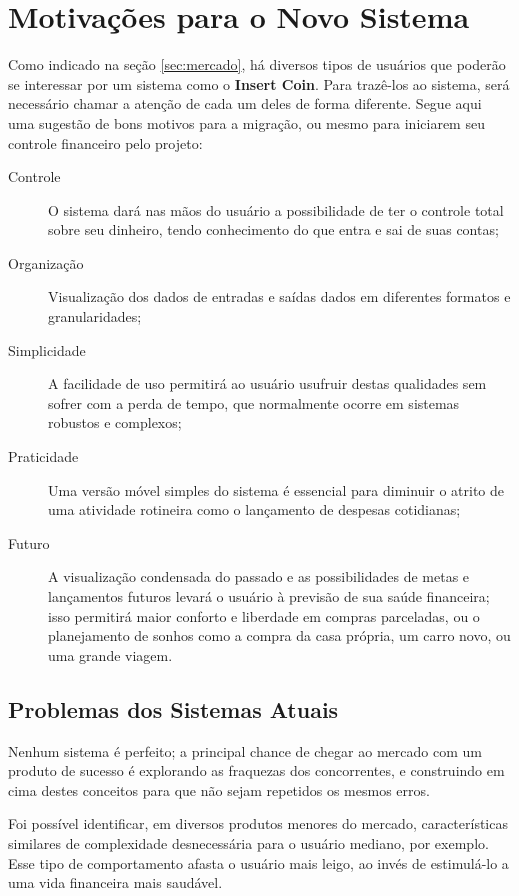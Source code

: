 \documentclass[a4paper]{abnt}
\begin{document}
\section{Motivaç\~oes para o Novo Sistema}
Como indicado na seç\~ao \ref{sec:mercado}, há diversos tipos de usuários que poder\~ao se interessar por um sistema como o \textbf{Insert Coin}. Para trazê-los ao sistema, será necessário chamar a atenç\~ao de cada um deles de forma diferente. Segue aqui uma sugest\~ao de bons motivos para a migraç\~ao, ou mesmo para iniciarem seu controle financeiro pelo projeto:

\begin{description}
	\item[Controle] O sistema dará nas m\~aos do usuário a possibilidade de ter o controle total sobre seu dinheiro, tendo conhecimento do que entra e sai de suas contas;
	\item[Organizaç\~ao] Visualizaç\~ao dos dados de entradas e saídas dados em diferentes formatos e granularidades;
	\item[Simplicidade] A facilidade de uso permitirá ao usuário usufruir destas qualidades sem sofrer com a perda de tempo, que normalmente ocorre em sistemas robustos e complexos;
	\item[Praticidade] Uma vers\~ao móvel simples do sistema é essencial para diminuir o atrito de uma atividade rotineira como o lançamento de despesas cotidianas;
	\item[Futuro] A visualizaç\~ao condensada do passado e as possibilidades de metas e lançamentos futuros levará o usuário à previs\~ao de sua saúde financeira; isso permitirá maior conforto e liberdade em compras parceladas, ou o planejamento de sonhos como a compra da casa própria, um carro novo, ou uma grande viagem.
\end{description}

\subsection{Problemas dos Sistemas Atuais}
Nenhum sistema é perfeito; a principal chance de chegar ao mercado com um produto de sucesso é explorando as fraquezas dos concorrentes, e construindo em cima destes conceitos para que n\~ao sejam repetidos os mesmos erros.

Foi possível identificar, em diversos produtos menores do mercado, características similares de complexidade desnecessária para o usuário mediano, por exemplo. Esse tipo de comportamento afasta o usuário mais leigo, ao invés de estimulá-lo a uma vida financeira mais saudável.
\end{document}
